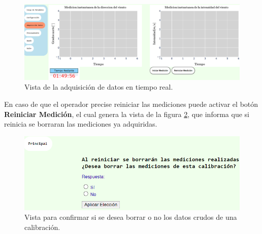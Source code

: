 \begin{figure}[H]
    \centering
    \includegraphics[width=1\linewidth]{Figuras/AplicacionWeb/frontend/adquisicionDatos.png}
    \caption{Vista de la adquisición de datos en tiempo real.}
    \label{fig:adquisicionDatos}
\end{figure}

En caso de que el operador precise reiniciar las mediciones puede activar el botón \textbf{Reiniciar Medición}, el cual genera la vista de la figura \ref{fig:borrarMediciones}, que informa que si reinicia se borraran las mediciones ya adquiridas.

\begin{figure}[H]
    \centering
    \includegraphics[width=0.8\linewidth]{Figuras/AplicacionWeb/frontend/borrarMediciones.png}
    \caption{Vista para confirmar si se desea borrar o no los datos crudos de una calibración.}
    \label{fig:borrarMediciones}
\end{figure}



